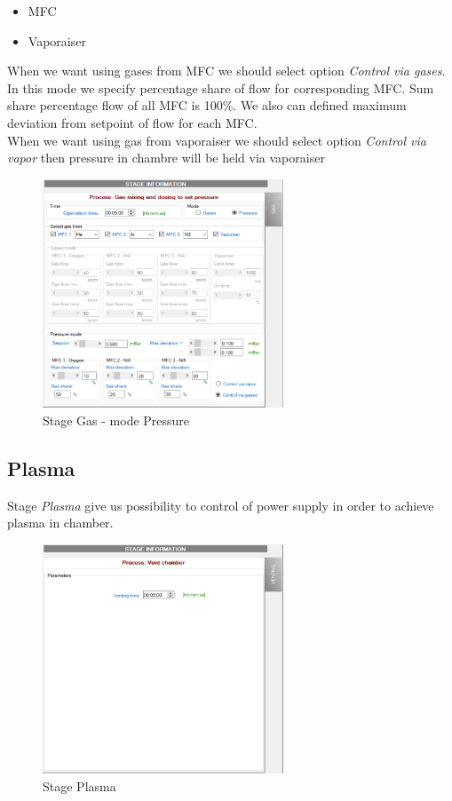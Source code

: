 \begin{itemize}
	\item MFC
	\item Vaporaiser 
\end{itemize} 

When we want using gases from MFC we should select option \textit{Control via gases}. In this mode we specify percentage share of flow for corresponding MFC. Sum share percentage flow of all MFC is 100\%.  We also can defined maximum deviation from setpoint of flow for each MFC. \\

When we want using gas from vaporaiser we should select option \textit{Control via vapor} then pressure in chambre will be held via vaporaiser


	\begin{figure}[!h] 
	\centering \includegraphics[width=0.64\textwidth]{Graphic/Programs/Gas_ModePressure.png}	
	\caption{Stage Gas - mode Pressure}
	\label{stage_gas_ mode_pressure}
	\end{figure}
	\FloatBarrier

\subsection{Plasma}

Stage \textit{Plasma} give us possibility to control of power supply in order to achieve plasma in chamber.

	\begin{figure}[!h] 
	\centering \includegraphics[width=0.64\textwidth]{Graphic/Programs/Venting.png}	
	\caption{Stage Plasma}
	\label{vent_purge}
	\end{figure}
	\FloatBarrier

